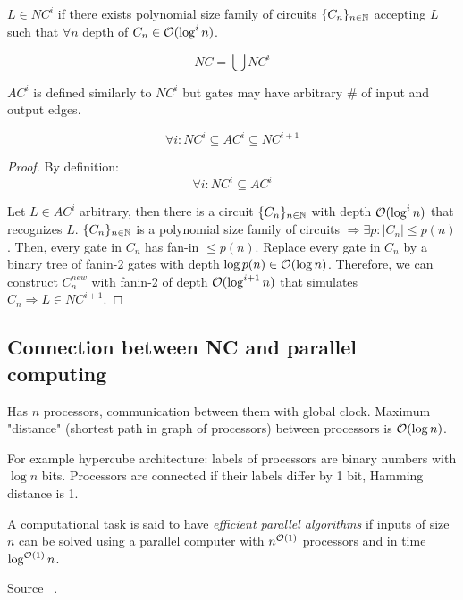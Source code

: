 \begin{definition}[Class NC]
	$L \in NC^i$ if there exists polynomial size family of circuits $\{ C_n \}_{n \in \operatorname{\mathbb{N}}}$ accepting $L$ such that $\forall n$ depth of $C_n \in \mathcal{O}(\log^i n)$.

	\[ NC = \bigcup NC^i \]
\end{definition}

\begin{definition}[Class AC]
	$AC^i$ is defined similarly to $NC^i$ but gates may have arbitrary \# of input and output edges.
\end{definition}

\begin{theorem}[NC and AC]\label{ac_dc}
	\[ \forall i: NC^i \subseteq AC^i \subseteq NC^{i + 1} \]
\end{theorem}
\begin{proof}
	By definition:
	\[ \forall i: NC^i \subseteq AC^i \]

	Let $L \in AC^i$ arbitrary, then there is a circuit $\{ C_n \}_{n \in \operatorname{\mathbb{N}}}$ with depth $\mathcal{O}(\log^i n)$ that recognizes $L$.
	$\{ C_n \}_{n \in \operatorname{\mathbb{N}}}$ is a polynomial size family of circuits $\Rightarrow \exists p: |C_n| \leq p(n)$.
	Then, every gate in $C_n$ has fan-in $\leq p(n)$.
	Replace every gate in $C_n$ by a binary tree of fanin-2 gates with depth $\log p(n) \in \mathcal{O}(\log n)$.
	Therefore, we can construct $C_n^{new}$ with fanin-2 of depth $\mathcal{O}(\log^{i + 1} n)$ that simulates $C_n \Rightarrow L \in NC^{i + 1}$.
\end{proof}

\subsection{Connection between NC and parallel computing}

\begin{definition}
	Has $n$ processors, communication between them with global clock.
	Maximum "distance" (shortest path in graph of processors) between processors is $\mathcal{O}(\log n)$.

	For example hypercube architecture: labels of processors are binary numbers with $\log n$ bits.
	Processors are connected if their labels differ by 1 bit, Hamming distance is 1.
\end{definition}

\begin{definition}
	A computational task is said to have \emph{efficient parallel algorithms} if inputs of size $n$ can be solved using a parallel computer with $n^{\mathcal{O}(1)}$ processors and in time $\log^{\mathcal{O}(1)} n$.

	Source ~\cite[p.~109]{arora2009computational}.
\end{definition}

